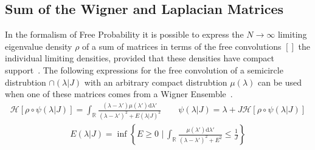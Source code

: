 \documentclass{article}[12pt]
\numberwithin{equation}{section}
\begin{document}
\subsection{Sum of the Wigner and Laplacian Matrices}
In the formalism of Free Probability it is possible to express the
$N\rightarrow\infty$ limiting eigenvalue density $\rho$ of a sum of
matrices in terms of the free convolutions $[]$ the individual limiting
densities, provided that these densities have compact support~\cite{}.
The following expressions for the free convolution of a semicircle distrubtion
$\cap(\lambda|J)$ with an arbitrary compact distrubtion $\mu(\lambda)$ can be
used when one of these matrices comes from a Wigner Ensemble~\cite{}.
\begin{align}
  \mathcal{H}[\rho\circ\psi(\lambda|J)]=
  \int_{\mathbb{R}}\frac{(\lambda-\lambda')\mu(\lambda')\mathrm{d}\lambda'}{(\lambda-\lambda')^2+E(\lambda|J)^2}
  \qquad
  \psi(\lambda|J)=
  \lambda+J\mathcal{H}[\rho\circ\psi(\lambda|J)]
\end{align}
\vspace{-30pt}
\begin{align}
  E(\lambda|J)=\inf
  \left\{
  E\geq 0\,\,\bigg|\,
  \int_{\mathbb{R}}\frac{\mu(\lambda')\mathrm{d}\lambda'}{(\lambda-\lambda')^2+E^2}
  \leq\frac{1}{J}
  \right\}
\end{align}
\end{document}

